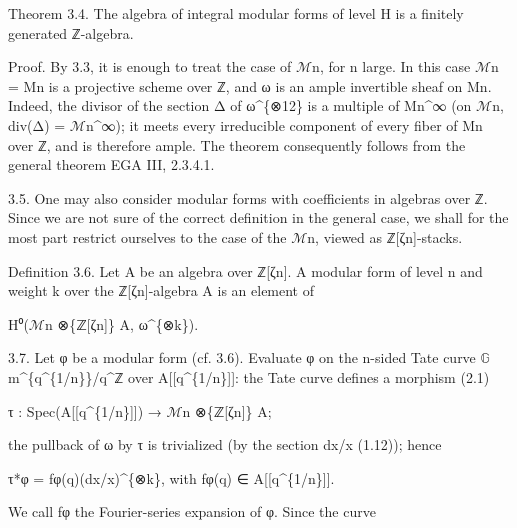 \documentclass[11pt,a4paper]{article}
\begin{document}
Theorem 3.4. The algebra of integral modular forms of level H is a finitely generated ℤ-algebra.

Proof. By 3.3, it is enough to treat the case of \ensuremath{\mathcal{M}}\textunderscore{}n, for n large. In this case \ensuremath{\mathcal{M}}\textunderscore{}n = M\textunderscore{}n is a projective scheme over ℤ, and ω is an ample invertible sheaf on M\textunderscore{}n. Indeed, the divisor of the section Δ of ω\textasciicircum{}\{⊗12\} is a multiple of M\textunderscore{}n\textasciicircum{}∞ (on \ensuremath{\mathcal{M}}\textunderscore{}n, div(Δ) = \ensuremath{\mathcal{M}}\textunderscore{}n\textasciicircum{}∞); it meets every irreducible component of every fiber of M\textunderscore{}n over ℤ, and is therefore ample. The theorem consequently follows from the general theorem EGA III, 2.3.4.1.

3.5. One may also consider modular forms with coefficients in algebras over ℤ. Since we are not sure of the correct definition in the general case, we shall for the most part restrict ourselves to the case of the \ensuremath{\mathcal{M}}\textunderscore{}n, viewed as ℤ[ζ\textunderscore{}n]-stacks.

Definition 3.6. Let A be an algebra over ℤ[ζ\textunderscore{}n]. A modular form of level n and weight k over the ℤ[ζ\textunderscore{}n]-algebra A is an element of

H⁰(\ensuremath{\mathcal{M}}\textunderscore{}n ⊗\textunderscore{}\{ℤ[ζ\textunderscore{}n]\} A, ω\textasciicircum{}\{⊗k\}).

3.7. Let φ be a modular form (cf. 3.6). Evaluate φ on the n-sided Tate curve \ensuremath{\mathbb{G}}\textunderscore{}m\textasciicircum{}\{q\textasciicircum{}\{1/n\}\}/q\textasciicircum{}ℤ over A[[q\textasciicircum{}\{1/n\}]]: the Tate curve defines a morphism (2.1)

τ : Spec(A[[q\textasciicircum{}\{1/n\}]]) → \ensuremath{\mathcal{M}}\textunderscore{}n ⊗\textunderscore{}\{ℤ[ζ\textunderscore{}n]\} A;

the pullback of ω by τ is trivialized (by the section dx/x (1.12)); hence

τ*φ = f\textunderscore{}φ(q)(dx/x)\textasciicircum{}\{⊗k\},  with f\textunderscore{}φ(q) ∈ A[[q\textasciicircum{}\{1/n\}]].

We call f\textunderscore{}φ the Fourier-series expansion of φ. Since the curve
\end{document}

